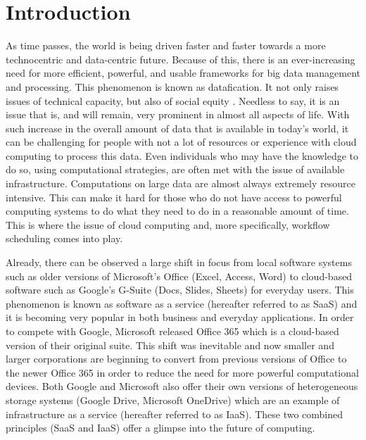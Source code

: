 \documentclass[fleqn,10pt]{SelfArx} %
\affiliation{\textsuperscript{1}\textit{Department of Computer Science, Allegheny College, Meadville, PA}}
\affiliation{*\textbf{Corresponding author}: lorian@allegheny.edu}
\begin{document}
\maketitle %

\tableofcontents %

\thispagestyle{empty} %


\section{Introduction}

As time passes, the world is being driven faster and faster towards a more technocentric and data-centric future. Because of this, there is an ever-increasing need for more efficient, powerful, and usable frameworks for big data management and processing. This phenomenon is known as datafication. It not only raises issues of technical capacity, but also of social equity \cite{mejias2019datafication}. Needless to say, it is an issue that is, and will remain, very prominent in almost all aspects of life. With such increase in the overall amount of data that is available in today's world, it can be challenging for people with not a lot of resources or experience with cloud computing to process this data. Even individuals who may have the knowledge to do so, using computational strategies, are often met with the issue of available infrastructure. Computations on large data are almost always extremely resource intensive. This can make it hard for those who do not have access to powerful computing systems to do what they need to do in a reasonable amount of time. This is where the issue of cloud computing and, more specifically, workflow scheduling comes into play.

Already, there can be observed a large shift in focus from local software systems such as older versions of Microsoft’s Office (Excel, Access, Word) to cloud-based software such as Google's G-Suite (Docs, Slides, Sheets) for everyday users. This phenomenon is known as software as a service (hereafter referred to as SaaS) and it is becoming very popular in both business and everyday applications. In order to compete with Google, Microsoft released Office 365 which is a cloud-based version of their original suite. This shift was inevitable and now smaller \cite{kim2017analysis} and larger corporations are beginning to convert from previous versions of Office to the newer Office 365 \cite{skendzic2012microsoft} in order to reduce the need for more powerful computational devices. Both Google and Microsoft also offer their own versions of heterogeneous storage systems (Google Drive, Microsoft OneDrive) which are an example of infrastructure as a service (hereafter referred to as IaaS). These two combined principles (SaaS and IaaS) offer a glimpse into the future of computing.
\end{document}
